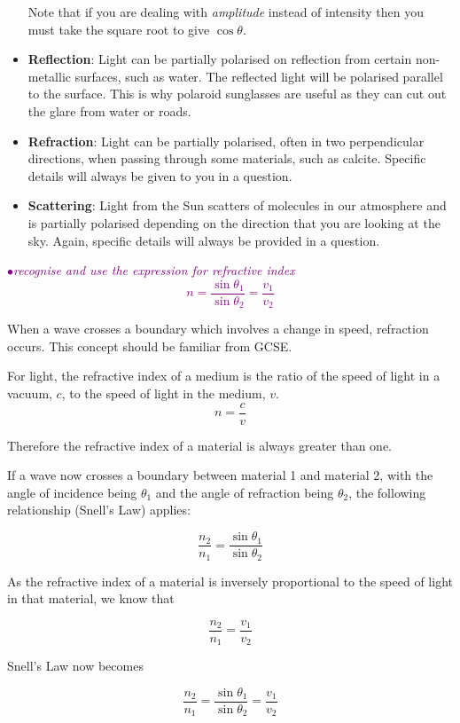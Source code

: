\documentclass[a4paper,11pt,twoside]{memoir}
\newcounter{spec}[chapter]
\newcommand{\spec}[1]{\Needspace{5\baselineskip}\textcolor{purple}{$\bullet$\hspace{0.5cm}\textit{#1}}}
\begin{document}
\begin{itemize}
Note that if you are dealing with \emph{amplitude} instead of intensity then you must take the square root to give $\cos\theta$.

\item\textbf{Reflection}: Light can be partially polarised on reflection from certain non-metallic surfaces, such as water. The reflected light will be polarised parallel to the surface. This is why polaroid sunglasses are useful as they can cut out the glare from water or roads.

\item\textbf{Refraction}: Light can be partially polarised, often in two perpendicular directions, when passing through some materials, such as calcite. Specific details will always be given to you in a question.

\item\textbf{Scattering}: Light from the Sun scatters of molecules in our atmosphere and is partially polarised depending on the direction that you are looking at the sky. Again, specific details will always be provided in a question.

\end{itemize}

\spec{recognise and use the expression for refractive index
\[ n = \frac{\sin{\theta_1}}{\sin{\theta_2}} = \frac{v_1}{v_2}\]}

When a wave crosses a boundary which involves a change in speed, refraction occurs. This concept should be familiar from GCSE.


For light, the refractive index of a medium is the ratio of the speed of light in a vacuum, $c$, to the speed of light in the medium, $v$.
\[n = \frac{c}{v}\]

Therefore the refractive index of a material is always greater than one.

If a wave now crosses a boundary between material 1 and material 2, with the angle of incidence being $\theta_1$ and the angle of refraction being $\theta_2$, the following relationship (Snell's Law) applies:

\[ \frac{n_2}{n_1} = \frac{\sin{\theta_1}}{\sin{\theta_2}}\]

As the refractive index of a material is inversely proportional to the speed of light in that material, we know that

\[\frac{n_2}{n_1} = \frac{v_1}{v_2} \]

Snell's Law now becomes

\[ \frac{n_2}{n_1} = \frac{\sin{\theta_1}}{\sin{\theta_2}} =  \frac{v_1}{v_2}\]
\end{document}
